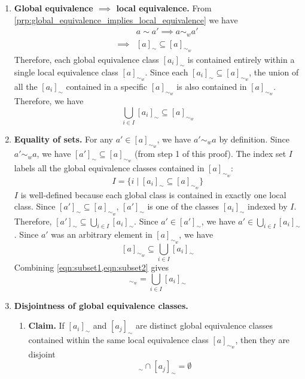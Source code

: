 \begin{proofE}
\begin{enumerate}
    \item \textbf{Global equivalence $\implies$ local equivalence.}
    From \cref{prp:global_equivalence_implies_local_equivalence} we have
    \begin{align}
        & a \sim a' \implies a \sim_{w} a' \\
        \implies & [a]_{\sim} \subseteq [a]_{\sim_{w}}
    \end{align}
    Therefore, each global equivalence class $[a_{i}]_{\sim}$ is contained entirely within a single local equivalence class $[a]_{\sim_{w}}$.
    Since each $[a_{i}]_{\sim} \subseteq [a]_{\sim_{w}}$, the union of all the $[a_{i}]_{\sim}$ contained in a specific $[a]_{\sim_{w}}$ is also contained in $[a]_{\sim_{w}}$.
    Therefore, we have
    \begin{equation}\label{eqn:subset1}
        \bigcup_{i \in I}[a_{i}]_{\sim} \subseteq [a]_{\sim_{w}}
    \end{equation}

    \item \textbf{Equality of sets.}
    For any $a' \in [a]_{\sim_{w}}$, we have $a' \sim_{w} a$ by definition.
    Since $a' \sim_{w} a$, we have $[a']_{\sim} \subseteq [a]_{\sim_{w}}$ (from step 1 of this proof).
    The index set $I$ labels all the global equivalence classes contained in $[a]_{\sim_{w}}$:
    \begin{equation}
        I = \{ i \mid [a_{i}]_{\sim} \subseteq [a]_{\sim_{w}} \}
    \end{equation}
    $I$ is well-defined because each global class is contained in exactly one local class.
    Since $[a']_{\sim} \subseteq [a]_{\sim_{w}}$, $[a']_{\sim}$ is one of the classes $[a_{i}]_{\sim}$ indexed by $I$.
    Therefore, $[a']_{\sim} \subseteq \bigcup_{i \in I}[a_{i}]_{\sim}$.
    Since $a' \in [a']_{\sim}$, we have $a' \in \bigcup_{i \in I}[a_{i}]_{\sim}$.
    Since $a'$ was an arbitrary element in $[a]_{\sim_{w}}$, we have
    \begin{equation}\label{eqn:subset2}
        [a]_{\sim_{w}} \subseteq \bigcup_{i \in I}[a_{i}]_{\sim}
    \end{equation}
    Combining \cref{eqn:subset1,eqn:subset2} gives
    \begin{equation}
        [a]_{\sim_{w}} = \bigcup_{i \in I}[a_{i}]_{\sim}
    \end{equation}
    
    \item \textbf{Disjointness of global equivalence classes.}
    \begin{enumerate}
        \item \textbf{Claim.}
        If $[a_{i}]_{\sim}$ and $[a_{j}]_{\sim}$ are distinct global equivalence classes contained within the same local equivalence class $[a]_{\sim_{w}}$, then they are disjoint
        \begin{equation}
            [a_{i}]_{\sim} \cap [a_{j}]_{\sim} = \emptyset
        \end{equation}


\end{enumerate}
\end{enumerate}
\end{proofE}
